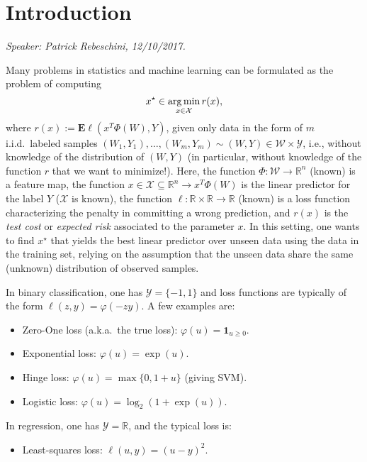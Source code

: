 
\section{Introduction}\label{sec:intro}
\emph{Speaker: Patrick Rebeschini, 12/10/2017.}\\

\label{sec:introduction}

Many problems in statistics and machine learning can be formulated as the problem of computing
\begin{equation}
	x^\star \in \operatorname*{arg\,min}_{x\in\mathcal{X}} r(x),
	\label{def:mainproblem}
\end{equation}
where $r(x):=\mathbf{E}\ell(x^T\Phi(W),Y)$, given only data in the form of $m$ i.i.d.\ labeled samples $(W_1,Y_1),\ldots,(W_m,Y_m) \sim (W,Y) \in \mathcal{W}\times\mathcal{Y}$, i.e., without knowledge of the distribution of $(W,Y)$ (in particular, without knowledge of the function $r$ that we want to minimize!). Here, the function $\Phi:\mathcal{W}\rightarrow\mathbb{R}^n$ (known) is a feature map, the function $x \in \mathcal{X}\subseteq\mathbb{R}^n \rightarrow x^T\Phi(W)$ is the linear predictor for the label $Y$ ($\mathcal{X}$ is known),
the function $\ell:\mathbb{R}\times \mathbb{R} \rightarrow \mathbb{R}$ (known) is a loss function characterizing the penalty in committing a wrong prediction, and $r(x)$ is the \emph{test cost}  or \emph{expected risk} associated to the parameter $x$. In this setting, one wants to find $x^\star$ that yields the best linear predictor over unseen data using the data in the training set, relying on the assumption that the unseen data share the same (unknown) distribution of observed samples.

In binary classification, one has $\mathcal{Y}=\{-1,1\}$ and loss functions are typically of the form $\ell(z,y) = \varphi(-zy)$. A few examples are:
\begin{itemize}
\item Zero-One loss (a.k.a.\ the true loss): $\varphi(u) = \mathbf{1}_{u\ge 0}$.
\item Exponential loss: $\varphi(u) = \exp(u)$.
\item Hinge loss: $\varphi(u) = \max\{0,1+u\}$ (giving SVM).
\item Logistic loss: $\varphi(u) = \log_2(1+\exp(u))$.
\end{itemize}
In regression, one has $\mathcal{Y}=\mathbb{R}$, and the typical loss is:
\begin{itemize}
\item Least-squares loss: $\ell(u,y) = (u-y)^2$.
\end{itemize}

